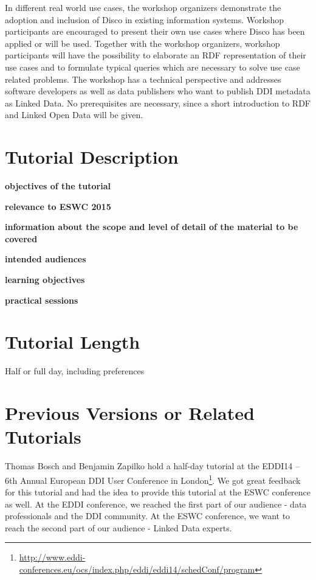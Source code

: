 \documentclass{llncs}
\begin{document}
In different real world use cases, the workshop organizers demonstrate the adoption and inclusion of Disco in existing information systems. Workshop participants are encouraged to present their own use cases where Disco has been applied or will be used. Together with the workshop organizers, workshop participants will have the possibility to elaborate an RDF representation of their use cases and to formulate typical queries which are necessary to solve use case related problems.
The workshop has a technical perspective and addresses software developers as well as data publishers who want to publish DDI metadata as Linked Data. No prerequisites are necessary, since a short introduction to RDF and Linked Open Data will be given.

\section{Tutorial Description}

\textbf{objectives of the tutorial} 

\textbf{relevance to ESWC 2015}

\textbf{information about the scope and level of detail of the material to be covered}

\textbf{intended audiences}

\textbf{learning objectives}

\textbf{practical sessions}

\section{Tutorial Length}

Half or full day, including preferences

\section{Previous Versions or Related Tutorials}

Thomas Bosch and Benjamin Zapilko hold a half-day tutorial at the EDDI14 – 6th Annual European DDI User Conference in London\footnote{\url{http://www.eddi-conferences.eu/ocs/index.php/eddi/eddi14/schedConf/program}}.
We got great feedback for this tutorial and had the idea to provide this tutorial at the ESWC conference as well.
At the EDDI conference, we reached the first part of our audience - data professionals and the DDI community.
At the ESWC conference, we want to reach the second part of our audience - Linked Data experts.
\end{document}
